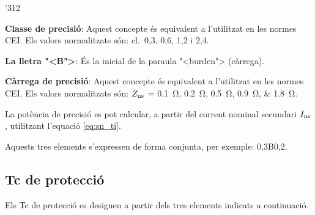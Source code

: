 \begin{dingautolist}{'312}
    \item \textbf{Classe de precisi\'{o}}: Aquest concepte \'{e}s equivalent
    a l'utilitzat en les normes \textsf{CEI}. Els valors
    normalitzats s\'{o}n: cl.~0,3, 0,6, 1,2 i 2,4.
    \item \textbf{La lletra {"<}B{">}}: \'{E}s la inicial de la paraula
    {"<}burden{">}  (c\`{a}rrega).
    \item \textbf{C\`{a}rrega de precisi\'{o}}: Aquest concepte \'{e}s equivalent
    a l'utilitzat en les normes \textsf{CEI}. Els valors
    normalitzats s\'{o}n: $Z_\mathrm{ns}$ = \SIlist{0,1;0,2;0,5;0,9;1,8}{\ohm}.

    La pot\`{e}ncia de precisi\'{o} es pot calcular, a partir del
    corrent  nominal secundari $I_\mathrm{ns}$, utilitzant l'equaci\'{o}
    \eqref{eq:sn_ti}.
\end{dingautolist}

Aquests tres elements s'expressen de forma conjunta, per exemple:
0,3B0,2.

\subsection{Tc de protecci\'{o}}

Els Tc de protecci\'{o} es designen a
partir dels tres elements indicats a continuaci\'{o}.


